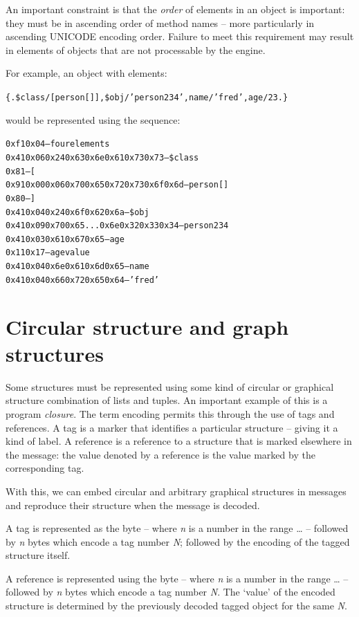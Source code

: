 An important constraint is that the \emph{order} of elements in an object is important: they must be in ascending order of method names -- more particularly in ascending UNICODE encoding order. Failure to meet this requirement may result in elements of objects that are not processable by the \go engine.

For example, an object with elements:
\begin{alltt}
\{. \$class/[person[]], \$obj/'person234', name/'fred', age/23 .\}
\end{alltt}
would be represented using the sequence:
\begin{alltt}
0xf1 0x04                       -- four elements
  0x41 0x06 0x24 0x63 0x6e 0x61 0x73 0x73 -- \$class
  0x81                          -- [
    0x91 0x00 0x06 0x70 0x65 0x72 0x73 0x6f 0x6d -- person[]
    0x80                        -- ]
  0x41 0x04 0x24 0x6f 0x62 0x6a -- \$obj
  0x41 0x09 0x70 0x65 ...  0x6e 0x32 0x33 0x34 -- person234
  0x41 0x03 0x61 0x67 0x65      -- age 
  0x11 0x17                     -- age value
  0x41 0x04 0x6e 0x61 0x6d 0x65 -- name
  0x41 0x04 0x66 0x72 0x65 0x64 -- 'fred'
\end{alltt}

\section{Circular structure and graph structures}
\label{encoded:graph}

Some structures must be represented using some kind of circular or graphical structure combination of lists and tuples. An important example of this is a program \emph{closure}. The term encoding permits this through the use of tags and references. A tag is a marker that identifies a particular structure -- giving it a kind of label. A reference is a reference to a structure that is marked elsewhere in the message: the value denoted by a reference is the value marked by the corresponding tag.

With this, we can embed circular and arbitrary graphical structures in messages and reproduce their structure when the message is decoded.

A tag is represented as the byte  -- where \emph{n} is a number in the range \ldots{} -- followed by \emph{n} bytes which encode a tag number \emph{N}; followed by the encoding of the tagged structure itself.

A reference is represented using the byte  -- where \emph{n} is a number in the range \ldots{} -- followed by \emph{n} bytes which encode a tag number \emph{N}. The `value' of the encoded structure is determined by the previously decoded tagged object for the same \emph{N}.

